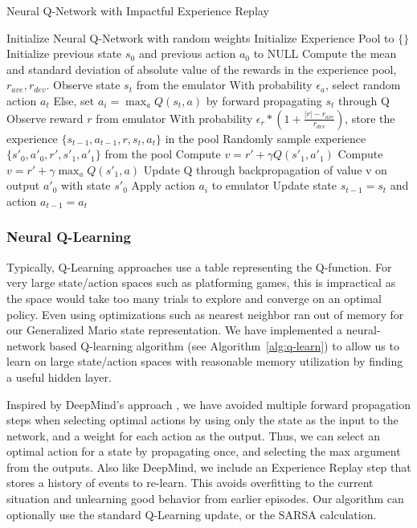 \documentclass{article}
\begin{document}
\begin{algorithm}[tb]
   \caption{Neural Q-Network with Impactful Experience Replay}
   \label{alg:q-learn}
\begin{algorithmic}
   \STATE Initialize Neural Q-Network with random weights
   \STATE Initialize Experience Pool to $\{ \}$
   \STATE Initialize previous state $s_0$ and previous action $a_0$ to NULL
   \STATE Compute the mean and standard deviation of absolute value of the rewards in the experience pool, $r_{ave}, r_{dev}$.
   \STATE Observe state $s_t$ from the emulator
   \STATE With probability $\epsilon_a$, select random action $a_t$
   \STATE Else, set $a_i = \max_a Q(s_t, a)$ by forward propagating $s_t$ through Q
   \STATE Observe reward $r$ from emulator
   \STATE With probability $\epsilon_r * (1 + \frac{|r| - r_{ave}}{r_{dev}})$, store the experience $\{s_{t-1}, a_{t-1}, r, s_t, a_t \}$ in the pool
   \ENDIF
   \STATE Randomly sample experience $\{s'_0, a'_0, r', s'_1, a'_1 \}$ from the pool
   \STATE Compute $v = r' + \gamma Q(s'_1, a'_1)$
   \ELSE
   \STATE Compute $v = r' + \gamma \max_a Q(s'_1, a)$
   \ENDIF
   \STATE Update Q through backpropagation of value v on output $a'_0$ with state $s'_0$
   \ENDFOR
   \STATE Apply action $a_i$ to emulator
   \STATE Update state $s_{t-1} = s_t$ and action $a_{t-1} = a_t$
   \ENDFOR
   \ENDFOR
\end{algorithmic}
\end{algorithm}

\subsubsection{Neural Q-Learning}

Typically, Q-Learning approaches use a table representing the Q-function. For very large state/action spaces such as platforming games, this is impractical as the space would take too many trials to explore and converge on an optimal policy. Even using optimizations such as nearest neighbor ran out of memory for our Generalized Mario state representation. We have implemented a neural-network based Q-learning algorithm (see Algorithm~\ref{alg:q-learn}) to allow us to learn on large state/action spaces with reasonable memory utilization by finding a useful hidden layer. 

Inspired by DeepMind's approach \cite{Mnih13}, we have avoided multiple forward propagation steps when selecting optimal actions by using only the state as the input to the network, and a weight for each action as the output. Thus, we can select an optimal action for a state by propagating once, and selecting the max argument from the outputs. Also like DeepMind, we include an Experience Replay step that stores a history of events to re-learn. This avoids overfitting to the current situation and unlearning good behavior from earlier episodes. Our algorithm can optionally use the standard Q-Learning update, or the SARSA calculation.
\end{document}
